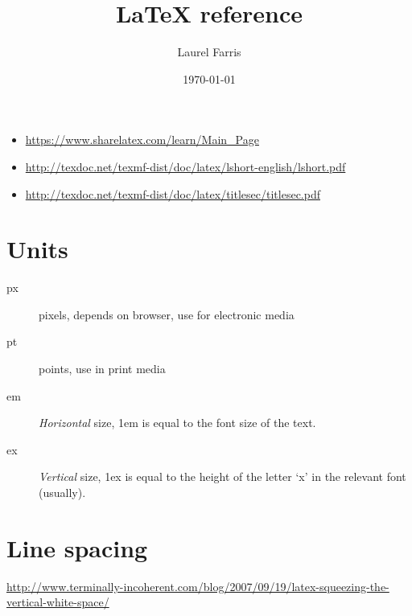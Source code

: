 \documentclass{article}
\title{LaTeX reference}
\author{Laurel Farris}
\date{\today}
\begin{document}
\maketitle
\begin{itemize}
    \item \url{https://www.sharelatex.com/learn/Main_Page}
    \item \url{http://texdoc.net/texmf-dist/doc/latex/lshort-english/lshort.pdf}
    \item \url{http://texdoc.net/texmf-dist/doc/latex/titlesec/titlesec.pdf}
\end{itemize}

\setlength{\columnsep}{30pt}
\setcounter{tocdepth}{1}
\setlength{\parskip}{2pt}
    \tableofcontents
\clearpage


\section{Units}
\begin{description}
    \item [px] pixels, depends on browser, use for electronic media
    \item [pt] points, use in print media
    \item [em] \emph{Horizontal} size, 1em is equal to the font size of
        the text.
    \item [ex] \emph{Vertical} size, 1ex is equal to the height of the
        letter `x' in the relevant font (usually).
\end{description}


\section{Line spacing}

\url{http://www.terminally-incoherent.com/blog/2007/09/19/latex-squeezing-the-vertical-white-space/}
\end{document}
